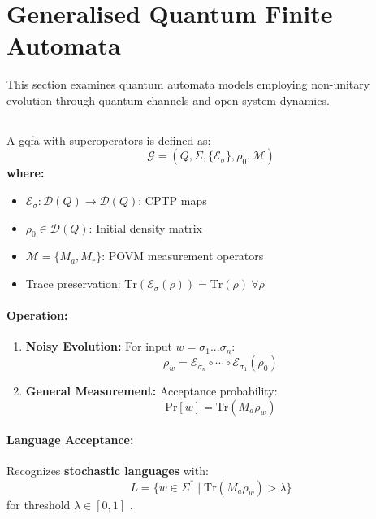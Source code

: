 \section{Generalised Quantum Finite Automata}
\label{sec:gqfa}

This section examines quantum automata models employing non-unitary evolution through quantum channels and open system dynamics.

\subsection{}
\label{subsec:gqfa}

\begin{definition}
A \gls{gqfa} with superoperators is defined as:
\[
\mathcal{G} = (Q, \Sigma, \{\mathcal{E}_\sigma\}, \rho_0, \mathcal{M})
\]
\textbf{where:}
\begin{itemize}
    \item $\mathcal{E}_\sigma: \mathcal{D}(Q) \rightarrow \mathcal{D}(Q)$: CPTP maps
    \item $\rho_0 \in \mathcal{D}(Q)$: Initial density matrix
    \item $\mathcal{M} = \{M_a, M_r\}$: POVM measurement operators
    \item Trace preservation: $\text{Tr}(\mathcal{E}_\sigma(\rho)) = \text{Tr}(\rho)\ \forall\rho$
\end{itemize}
\end{definition}

\paragraph{Operation:}
\begin{enumerate}
    \item \textbf{Noisy Evolution:} For input $w = \sigma_1...\sigma_n$:
    \[
    \rho_w = \mathcal{E}_{\sigma_n} \circ \cdots \circ \mathcal{E}_{\sigma_1} (\rho_0)
    \]
    \item \textbf{General Measurement:} Acceptance probability:
    \[
    \text{Pr}[w] = \text{Tr}(M_a \rho_w)
    \]
\end{enumerate}

\paragraph{Language Acceptance:}
Recognizes \textbf{stochastic languages} with:
\[
L = \{w \in \Sigma^* \mid \text{Tr}(M_a \rho_w) > \lambda\}
\]
for threshold $\lambda \in [0,1]$ \cite{hirvensalo2012quantum}.

